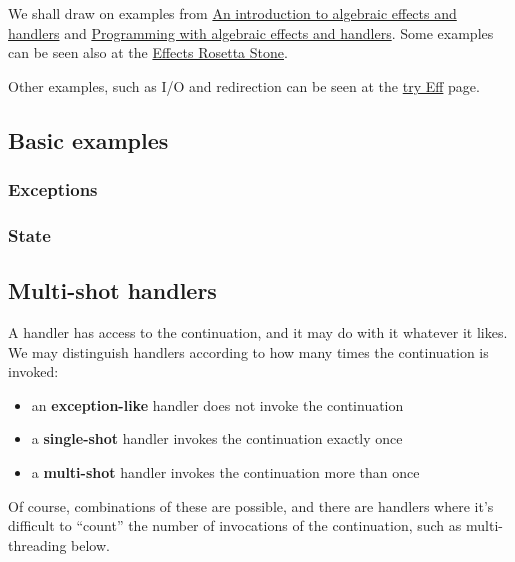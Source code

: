 \documentclass{article}
\begin{document}
We shall draw on examples from
\href{http://www.eff-lang.org/handlers-tutorial.pdf}{An introduction to
algebraic effects and handlers} and
\href{https://arxiv.org/abs/1203.1539}{Programming with algebraic
effects and handlers}. Some examples can be seen also at the
\href{https://github.com/effect-handlers/effects-rosetta-stone}{Effects
Rosetta Stone}.

Other examples, such as I/O and redirection can be seen at the
\href{http://www.eff-lang.org/try/}{try Eff} page.

\hypertarget{basic-examples}{%
\subsection{Basic examples}\label{basic-examples}}

\subsubsection*{Exceptions}
\label{sec:exceptions}



\subsubsection*{State}
\label{sec:state}



\hypertarget{multi-shot-handlers}{%
\subsection{Multi-shot handlers}\label{multi-shot-handlers}}

A handler has access to the continuation, and it may do with it whatever
it likes. We may distinguish handlers according to how many times the
continuation is invoked:

\begin{itemize}
\item
  an \textbf{exception-like} handler does not invoke the continuation
\item
  a \textbf{single-shot} handler invokes the continuation exactly once
\item
  a \textbf{multi-shot} handler invokes the continuation more than once
\end{itemize}

Of course, combinations of these are possible, and there are handlers
where it's difficult to ``count'' the number of invocations of the
continuation, such as multi-threading below.
\end{document}
